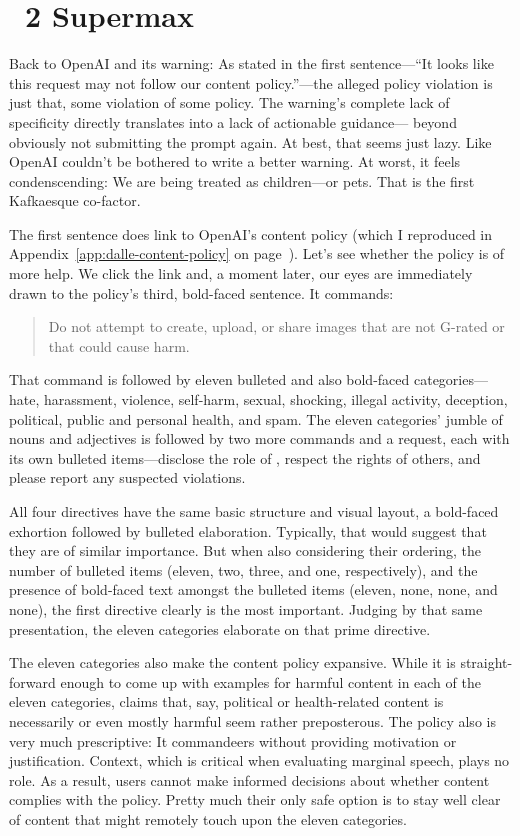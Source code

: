 \section{\DDAALLEE\ 2 Supermax}
\label{sec:dalle}

Back to OpenAI and its warning: As stated in the first sentence---``It looks
like this request may not follow our content policy.''---the alleged policy
violation is just that, some violation of some policy. The warning's complete
lack of specificity directly translates into a lack of actionable guidance---%
beyond obviously not submitting the prompt again. At best, that seems just lazy.
Like OpenAI couldn't be bothered to write a better warning. At worst, it
feels condenscending: We are being treated as children---or pets. That is the
first Kafkaesque co-factor.

The first sentence does link to OpenAI's content policy (which I reproduced in
Appendix~\ref{app:dalle-content-policy} on
page~\pageref{app:dalle-content-policy}). Let's see whether the policy is of
more help. We click the link and, a moment later, our eyes are immediately drawn
to the policy's third, bold-faced sentence. It commands:

\begin{quote}
\openfat{}Do not attempt to create, upload, or share images that are not
G-rated or that could cause harm.\closefat{}
\end{quote}

\noindent{}That command is followed by eleven bulleted and also bold-faced
categories---hate, harassment, violence, self-harm, sexual, shocking, illegal
activity, deception, political, public and personal health, and spam. The eleven
categories' jumble of nouns and adjectives is followed by two more commands and
a request, each with its own bulleted items---disclose the role of ,
respect the rights of others, and please report any suspected violations.

All four directives have the same basic structure and visual layout, a
bold-faced exhortion followed by bulleted elaboration. Typically, that would
suggest that they are of similar importance. But when also considering their
ordering, the number of bulleted items (eleven, two, three, and one,
respectively), and the presence of bold-faced text amongst the bulleted items
(eleven, none, none, and none), the first directive clearly is the most
important. Judging by that same presentation, the eleven categories elaborate on
that prime directive.

The eleven categories also make the content policy expansive. While it is
straight-forward enough to come up with examples for harmful content in each of
the eleven categories, claims that, say, political or health-related content is
necessarily or even mostly harmful seem rather preposterous. The policy also is
very much prescriptive: It commandeers without providing motivation or
justification. Context, which is critical when evaluating marginal speech, plays
no role. As a result, users cannot make informed decisions about whether content
complies with the policy. Pretty much their only safe option is to stay well
clear of content that might remotely touch upon the eleven categories.

